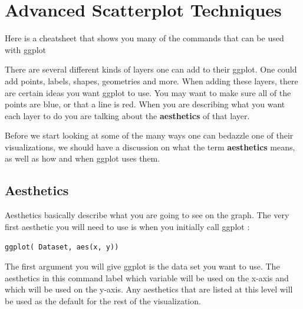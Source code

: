\documentclass[
  letterpaper,
  DIV=11,
  numbers=noendperiod]{scrreprt}
\begin{document}
\chapter*{Advanced Scatterplot
Techniques}\label{advanced-scatterplot-techniques}


\begin{tcolorbox}[enhanced jigsaw, bottomrule=.15mm, breakable, toprule=.15mm, leftrule=.75mm, rightrule=.15mm, opacitybacktitle=0.6, left=2mm, title=\textcolor{quarto-callout-tip-color}{\faLightbulb}\hspace{0.5em}{ggplot cheatsheet}, bottomtitle=1mm, arc=.35mm, colbacktitle=quarto-callout-tip-color!10!white, titlerule=0mm, toptitle=1mm, colframe=quarto-callout-tip-color-frame, colback=white, opacityback=0, coltitle=black]

Here is a cheatsheet that shows you many of the commands that can be
used with ggplot

\end{tcolorbox}

There are several different kinds of layers one can add to their ggplot.
One could add points, labels, shapes, geometries and more. When adding
these layers, there are certain ideas you want ggplot to use. You may
want to make sure all of the points are blue, or that a line is red.
When you are describing what you want each layer to do you are talking
about the \textbf{aesthetics} of that layer.

Before we start looking at some of the many ways one can bedazzle one of
their visualizations, we should have a discussion on what the term
\textbf{aesthetics} means, as well as how and when ggplot uses them.

\section*{Aesthetics}\label{aesthetics}


Aesthetics basically describe what you are going to see on the graph.
The very first aesthetic you will need to use is when you initially call
ggplot :

\texttt{ggplot(\ Dataset,\ aes(x,\ y))}

The first argument you will give ggplot is the data set you want to use.
The aesthetics in this command label which variable will be used on the
x-axis and which will be used on the y-axis. Any aesthetics that are
listed at this level will be used as the default for the rest of the
visualization.
\end{document}
